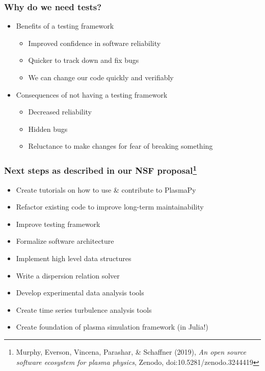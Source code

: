 \documentclass[default,compress]{beamer}
\begin{document}
\begin{frame}[plain]
    \frametitle{Why do we need tests?}
    \begin{itemize}
    \item Benefits of a testing framework
        \begin{itemize}
        \item Improved confidence in software reliability
        \item Quicker to track down and fix bugs
        \item We can change our code quickly and verifiably
        \end{itemize}
    \item Consequences of not having a testing framework
        \begin{itemize}
        \item Decreased reliability
        \item Hidden bugs
        \item Reluctance to make changes for fear of breaking something
        \end{itemize}
    \end{itemize}
\end{frame}


\begin{frame}[plain]
    \frametitle{Next steps as described in our NSF proposal\footnote{Murphy, Everson,  Vincena, Parashar, \& Schaffner (2019), \emph{An open source software ecosystem for plasma physics}, Zenodo, doi:10.5281/zenodo.3244419}}
    \begin{itemize}
    \item Create tutorials on how to use \& contribute to PlasmaPy
    \item Refactor existing code to improve long-term maintainability
    \item Improve testing framework
    \item Formalize software architecture
    \item Implement high level data structures
    \item Write a dispersion relation solver
    \item Develop experimental data analysis tools
    \item Create time series turbulence analysis tools
    \item Create foundation of plasma simulation framework (in Julia!)
    \end{itemize}
\end{frame}
\end{document}
